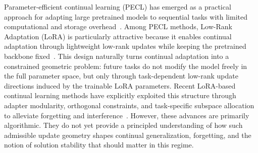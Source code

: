 \documentclass[10pt]{article} %
\begin{document}


Parameter-efficient continual learning (PECL) has emerged as a practical approach for adapting large pretrained models to sequential tasks with limited computational and storage overhead~\cite{pmlr-v97-houlsby19a,Wang_2022_CVPR,dingParameterefficientFinetuningLargescale2023,xu2023parameterefficientfinetuningmethodspretrained}. Among PECL methods, Low-Rank Adaptation (LoRA) is particularly attractive because it enables continual adaptation through lightweight low-rank updates while keeping the pretrained backbone fixed~\cite{hu2022lora}. This design naturally turns continual adaptation into a constrained geometric problem: future tasks do not modify the model freely in the full parameter space, but only through task-dependent low-rank update directions induced by the trainable LoRA parameters. Recent LoRA-based continual learning methods have explicitly exploited this structure through adapter modularity, orthogonal constraints, and task-specific subspace allocation to alleviate forgetting and interference~\cite{Gao_2023_ICCV,NEURIPS2020_70d85f35,wang2023orthogonal,wu2025sdlorascalabledecoupledlowrank}. However, these advances are primarily algorithmic. They do not yet provide a principled understanding of how such admissible update geometry shapes continual generalization, forgetting, and the notion of solution stability that should matter in this regime.
\end{document}
